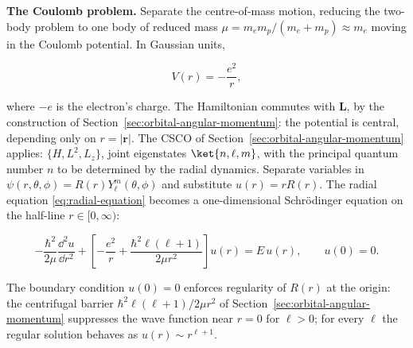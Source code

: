 \medskip\noindent\textbf{The Coulomb problem.} Separate the centre-of-mass motion, reducing the two-body problem to one body of reduced mass $\mu = m_e m_p/(m_e + m_p) \approx m_e$ moving in the Coulomb potential. In Gaussian units,
\begin{linenomath}
\begin{equation*}
V(r) = -\frac{e^2}{r},
\end{equation*}
\end{linenomath}
where $-e$ is the electron's charge. The Hamiltonian commutes with $\bm L$, by the construction of Section~\ref{sec:orbital-angular-momentum}: the potential is central, depending only on $r = |\bm r|$. The CSCO of Section~\ref{sec:orbital-angular-momentum} applies: $\{H, L^2, L_z\}$, joint eigenstates $\ket{n,\ell,m}$, with the principal quantum number $n$ to be determined by the radial dynamics. Separate variables in $\psi(r,\theta,\phi) = R(r)Y_\ell^m(\theta,\phi)$ and substitute $u(r) = rR(r)$. The radial equation \eqref{eq:radial-equation} becomes a one-dimensional Schr\"odinger equation on the half-line $r \in [0,\infty)$:
\begin{linenomath}
\begin{equation}
-\frac{\hbar^2}{2\mu}\frac{\dd^2 u}{\dd r^2}
+ \left[-\frac{e^2}{r} + \frac{\hbar^2\ell(\ell+1)}{2\mu r^2}\right] u(r)
= E\,u(r),
\qquad u(0) = 0 .
\label{eq:hydrogen-radial}
\end{equation}
\end{linenomath}
The boundary condition $u(0)=0$ enforces regularity of $R(r)$ at the origin: the centrifugal barrier $\hbar^2\ell(\ell+1)/2\mu r^2$ of Section~\ref{sec:orbital-angular-momentum} suppresses the wave function near $r=0$ for $\ell>0$; for every $\ell$ the regular solution behaves as $u(r) \sim r^{\ell+1}$.

